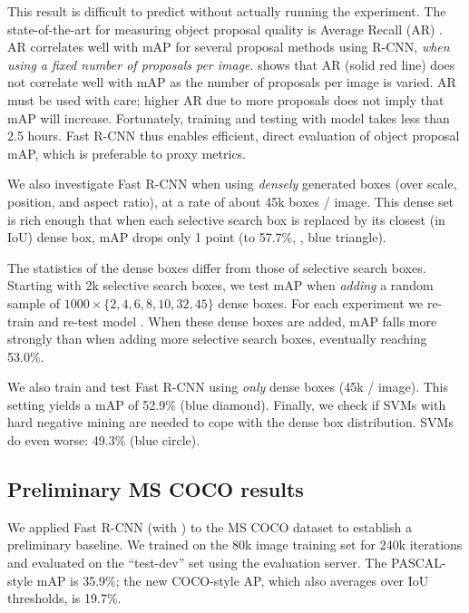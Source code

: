 This result is difficult to predict without actually running the experiment.
The state-of-the-art for measuring object proposal quality is Average Recall (AR) \cite{Hosang15proposals}.
AR correlates well with mAP for several proposal methods using R-CNN, \emph{when using a fixed number of proposals per image}.
 shows that AR (solid red line) does not correlate well with mAP as the number of proposals per image is varied.
AR must be used with care; higher AR due to more proposals does not imply that mAP will increase.
Fortunately, training and testing with model \Med takes less than 2.5 hours.
Fast R-CNN thus enables efficient, direct evaluation of object proposal mAP, which is preferable to proxy metrics.


We also investigate Fast R-CNN when using \emph{densely} generated boxes (over scale, position, and aspect ratio), at a rate of about 45k boxes / image.
This dense set is rich enough that when each selective search box is replaced by its closest (in IoU) dense box, mAP drops only 1 point (to 57.7\%, , blue triangle).

The statistics of the dense boxes differ from those of selective search boxes.
Starting with 2k selective search boxes, we test mAP when \emph{adding} a random sample of $1000 \times \{2,4,6,8,10,32,45\}$ dense boxes.
For each experiment we re-train and re-test model \Med.
When these dense boxes are added, mAP falls more strongly than when adding more selective search boxes, eventually reaching 53.0\%.

We also train and test Fast R-CNN using \emph{only} dense boxes (45k / image).
This setting yields a mAP of 52.9\% (blue diamond).
Finally, we check if SVMs with hard negative mining are needed to cope with the dense box distribution.
SVMs do even worse: 49.3\% (blue circle).


\subsection{Preliminary MS COCO results}
We applied Fast R-CNN (with \vggsixteen) to the MS COCO dataset \cite{coco} to establish a preliminary baseline.
We trained on the 80k image training set for 240k iterations and evaluated on the ``test-dev'' set using the evaluation server.
The PASCAL-style mAP is 35.9\%; the new COCO-style AP, which also averages over IoU thresholds, is 19.7\%.
